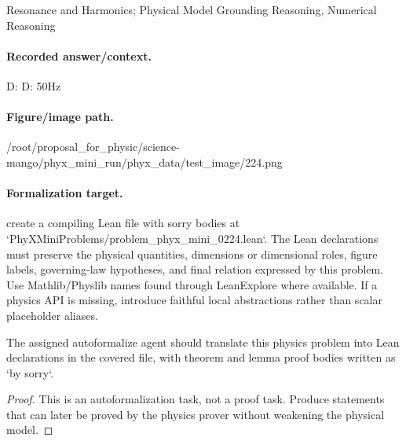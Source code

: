 Resonance and Harmonics; Physical Model Grounding Reasoning, Numerical Reasoning

\paragraph{Recorded answer/context.}
D: D: 50Hz

\paragraph{Figure/image path.}
/root/proposal\_for\_physic/science-mango/phyx\_mini\_run/phyx\_data/test\_image/224.png

\paragraph{Formalization target.}
create a compiling Lean file with sorry bodies at `PhyXMiniProblems/problem\_phyx\_mini\_0224.lean`. The Lean declarations must preserve the physical quantities, dimensions or dimensional roles, figure labels, governing-law hypotheses, and final relation expressed by this problem.
Use Mathlib/Physlib names found through LeanExplore where available. If a physics API is missing, introduce faithful local abstractions rather than scalar placeholder aliases.

\begin{theorem}
\label{thm:physics:phyx_mini_0224:target}
The assigned autoformalize agent should translate this physics problem into Lean declarations in the covered file, with theorem and lemma proof bodies written as `by sorry`.
\end{theorem}
\begin{proof}
This is an autoformalization task, not a proof task. Produce statements that can later be proved by the physics prover without weakening the physical model.
\end{proof}

